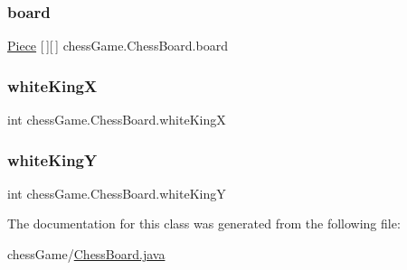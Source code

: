 \hypertarget{classchess_game_1_1_chess_board_ac851bb6b1a6562f524230678e6ea04d4}{}\label{classchess_game_1_1_chess_board_ac851bb6b1a6562f524230678e6ea04d4} 
\subsubsection{\texorpdfstring{board}{board}}
{\footnotesize\ttfamily \hyperlink{classchess_game_1_1_piece}{Piece} \mbox{[}$\,$\mbox{]}\mbox{[}$\,$\mbox{]} chess\+Game.\+Chess\+Board.\+board\hspace{0.3cm}{\ttfamily [private]}}

\hypertarget{classchess_game_1_1_chess_board_a7a22897cc91cbd040a4eb3b67be91a3a}{}\label{classchess_game_1_1_chess_board_a7a22897cc91cbd040a4eb3b67be91a3a} 
\subsubsection{\texorpdfstring{white\+KingX}{whiteKingX}}
{\footnotesize\ttfamily int chess\+Game.\+Chess\+Board.\+white\+KingX\hspace{0.3cm}{\ttfamily [private]}}

\hypertarget{classchess_game_1_1_chess_board_a6387ba212f7d9ee61e38c35d4e26d4c8}{}\label{classchess_game_1_1_chess_board_a6387ba212f7d9ee61e38c35d4e26d4c8} 
\subsubsection{\texorpdfstring{white\+KingY}{whiteKingY}}
{\footnotesize\ttfamily int chess\+Game.\+Chess\+Board.\+white\+KingY\hspace{0.3cm}{\ttfamily [private]}}



The documentation for this class was generated from the following file\+:\begin{DoxyCompactItemize}
\item 
chess\+Game/\hyperlink{_chess_board_8java}{Chess\+Board.\+java}\end{DoxyCompactItemize}
